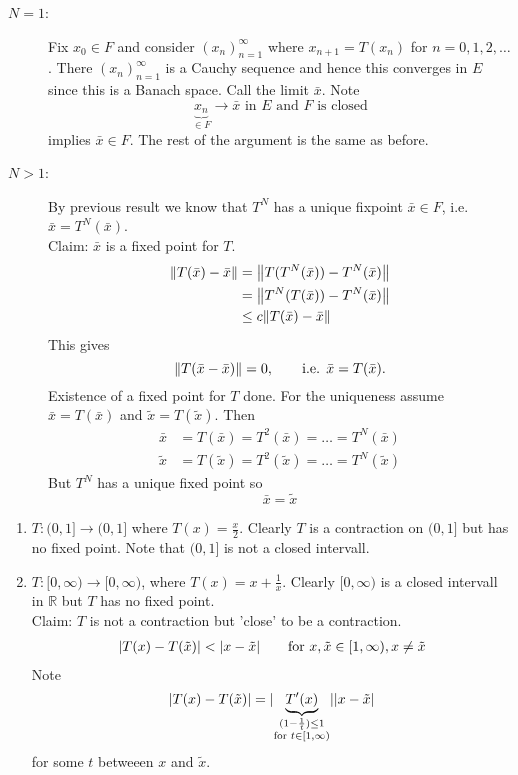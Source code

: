 \begin{beweis}
	\begin{description}
		\item[$N=1$:] Fix $x_0 \in F$ and consider $(x_n)_{n=1}^{\infty}$ where $x_{n+1} = T(x_n)$ for $n=0,1,2, \dots$. There $(x_n)_{n=1}^{\infty}$ is a Cauchy sequence and hence this converges in $E$ since this is a Banach space. Call the limit $\bar{x}$. Note
		\[
			\underset{\in F}{\underbrace{x_n}} \to \bar{x} \text{ in }E \text{ and $F$ is closed}
		\] 
		implies $\bar{x} \in F$. The rest of the argument is the same as before.
		\item[$N>1$:] By previous result we know that $T^N$ has a unique fixpoint $\bar{x} \in F$, i.e. $\bar{x} = T^N(\bar{x})$. \\
		Claim: $\bar{x}$ is a fixed point for $T$.
		\begin{align*}
			\norm{T(\bar{x})-\bar{x}} &= \norm{T(T^N(\bar{x}))- T^N(\bar{x})} \\
			&= \norm{T^N(T(\bar{x}))- T^N(\bar{x})} \\
			&\leq c \norm{T(\bar{x})-\bar{x}}
 		\end{align*}
		This gives 
		\[
			\norm{T(\bar{x}-\bar{x})} = 0, \qquad \text{i.e. }\bar{x} = T(\bar{x}).
		\]
		Existence of a fixed point for $T$ done. For the uniqueness assume $\bar{x} = T(\bar{x})$ and $\tilde x = T( \tilde x)$. Then
	\begin{align*}
		\bar{x} &= T( \bar{x}) = T^2(\bar{x}) = \dots = T^N(\bar{x}) \\
		\tilde x &= T(\tilde x) = T^2(\tilde x) = \dots = T^N(\tilde x)
	\end{align*}
	But $T^N$ has a unique fixed point so 
	\[
		\bar{x} = \tilde x
	\]
	\end{description}
\end{beweis}
\begin{bemerkung}
	\begin{enumerate}[(1)]
		\item $T: (0,1] \to (0,1]$ where $T(x) = \frac{x}{2}$. Clearly $T$ is a contraction on $(0,1]$ but has no fixed point. Note that $(0,1]$ is not a closed intervall. 
		\item $T: [0,\infty) \to [0,\infty)$, where $T(x) = x + \frac{1}{x}$. Clearly $[0,\infty)$ is a closed intervall in $\mathbb{R}$ but $T$ has no fixed point. \\
		Claim: $T$ is not a contraction but 'close' to be a contraction. \\
		\begin{align*}
			\lvert T(x)-T(\tilde x)\rvert < \lvert x- \tilde x\rvert \qquad \text{for }x, \tilde x \in [1, \infty), x \neq \tilde x
		\end{align*}
		Note \[
			\lvert T(x)- T( \tilde x)\rvert = \lvert\underset{\substack{(1- \frac{1}{t})\leq 1 \\ \text{for }t \in [1,\infty)}}{\underbrace{T'(x)}}\rvert\lvert x- \tilde x\rvert
		\] for some $t$ betweeen $x$ and $\tilde x$.
	\end{enumerate}
\end{bemerkung}
